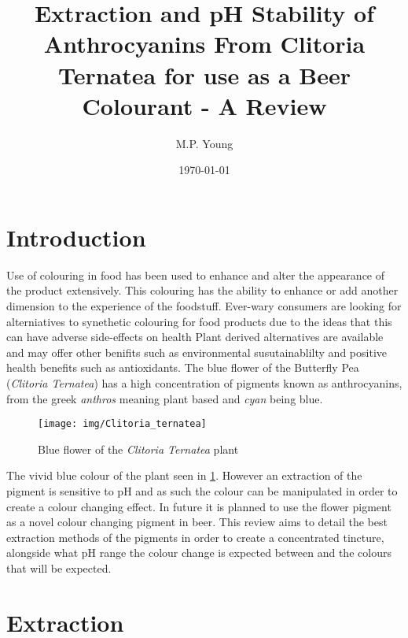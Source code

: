 \documentclass[12pt,a4paper,twocolumn]{article}
\begin{document}
	\title{Extraction and pH Stability of Anthrocyanins From Clitoria Ternatea for use as a Beer Colourant - A Review}
	\author{M.P. Young}
	\date{\today}
	\maketitle
	\abstract{}
	\section{Introduction}
	Use of colouring in food has been used to enhance and alter the appearance of the product extensively.
	This colouring has the ability to enhance or add another dimension to the experience of the foodstuff. %
	Ever-wary consumers are looking for alterniatives to synethetic colouring for food products due to the ideas that this can have adverse side-effects on health %
	Plant derived alternatives are available and may offer other benifits such as environmental susutainablilty and positive health benefits such as antioxidants.
	The blue flower of the Butterfly Pea (\textit{Clitoria Ternatea}) has a high concentration of pigments known as anthrocyanins, %
		from the greek \textit{anthros} meaning plant based and \textit{cyan} being blue.  %
	\begin{figure}[h]
		\centering
		\texttt{[image: img/Clitoria\_ternatea]}
		\caption{Blue flower of the \textit{Clitoria Ternatea} plant}
		\label{flower}
	\end{figure}
	The vivid blue colour of the plant seen in \ref{flower}. 
	However an extraction of the pigment is sensitive to pH and as such the colour can be manipulated in order to create a colour changing effect.
	In future it is planned to use the flower pigment as a novel colour changing pigment in beer.
	This review aims to detail the best extraction methods of the pigments in order to create a concentrated tincture, alongside what pH range the colour change
	is expected between and the colours that will be expected.

	\section{Extraction}
	
\end{document}
